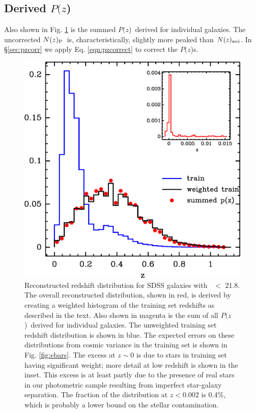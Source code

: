 \documentclass[12pt,preprint]{aastex}
\newcommand{\rmax}{21.8}
\newcommand{\pofz}{$P(z$)}
\newcommand{\nwei}{N(z)_{\rm wei}}
\newcommand{\npz}{N(z)_{\rm P}}
\begin{document}
\subsection{Derived \pofz}

Also shown in Fig. \ref{fig:pofz} is the summed \pofz\ derived for individual
galaxies.  The uncorrected $\npz$\ is, characteristically, slightly more peaked than
$\nwei$.
In \S \ref{sec:pzcorr} we apply Eq. \ref{eqn:pzcorrect} to correct the \pofz s.

\begin{figure}[p] \centering
    \includegraphics[scale=0.9]{figures/zweight-10-zhist-withorig-withsum-12.eps}

    \caption{Reconstructed redshift distribution for SDSS galaxies with \rmag\
    $ < $ \rmax.  The overall reconstructed distribution, shown in red, is
    derived by creating a weighted histogram of the training set redshifts as
    described in the text.  Also shown in magenta is the sum of all \pofz\
    derived for individual galaxies.  The unweighted training set redshift
    distribution is shown in blue.  The expected errors on these distributions
    from cosmic variance in the training set is shown in Fig.  \ref{fig:ebars}.
    The excess at $z \sim 0$ is due to stars in training set having significant
    weight; more detail at low redshift is shown in the inset.  This excess is
    at least partly due to the presence of real stars in our photometric sample
    resulting from imperfect star-galaxy separation.  The fraction of the
    distribution at $z < 0.002$ is 0.4\%, which is probably a lower bound on
    the stellar contamination.  \label{fig:pofz}}

    \vspace{2em}
\end{figure}
\end{document}
